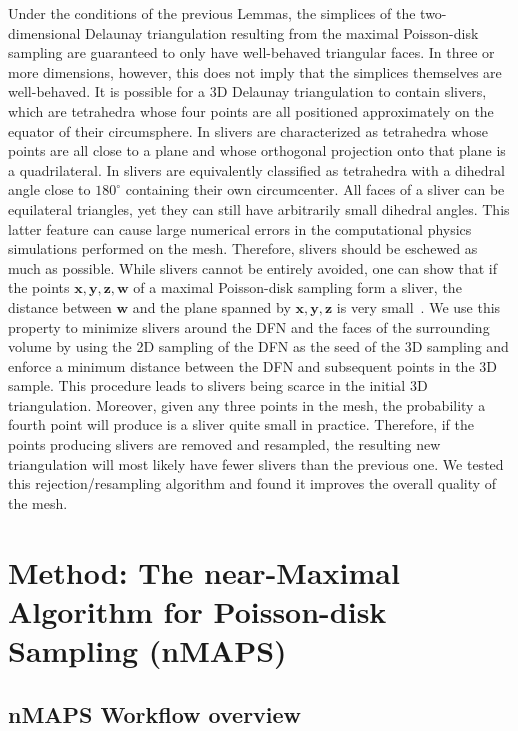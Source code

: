 \documentclass[preprint, 10pt]{elsarticle}
\newcommand{\vx}{{\mathbf x}}
\newcommand{\vy}{{\mathbf y}}
\newcommand{\vz}{{\mathbf z}}
\newcommand{\vw}{{\mathbf w}}
\theoremstyle{definition}
\theoremstyle{remark}
\begin{document}
Under the conditions of the previous Lemmas, the simplices of the two-dimensional Delaunay triangulation resulting from the maximal Poisson-disk sampling are guaranteed to only have well-behaved triangular faces. 
In three or more dimensions, however, this does not imply that the simplices themselves are well-behaved.
It is possible for a 3D Delaunay triangulation to contain slivers, which are tetrahedra whose four points are all positioned approximately on the equator of their circumsphere. 
In \cite{exudation} slivers are characterized as tetrahedra whose points are all close to a plane and whose orthogonal projection onto that plane is a quadrilateral. 
In \cite{bern} slivers are equivalently classified as tetrahedra with a dihedral angle close to $180^\circ$ containing their own circumcenter.
All faces of a sliver can be equilateral triangles, yet they can still have arbitrarily small dihedral angles.
This latter feature can cause large numerical errors in the computational physics simulations performed on the mesh.
Therefore, slivers should be eschewed as much as possible.
While slivers cannot be entirely avoided, one can show that if the points $\vx,\vy,\vz,\vw$ of a maximal Poisson-disk sampling form a sliver, the distance between $\vw$ and the plane spanned by $\vx,\vy,\vz$ is very small~\cite{exudation}.
We use this property to minimize slivers around the DFN and the faces of the surrounding volume by using the 2D sampling of the DFN as the seed of the 3D sampling and enforce a minimum distance between the DFN and subsequent points in the 3D sample.  
This procedure leads to slivers being scarce in the initial 3D triangulation.
Moreover, given any three points in the mesh, the probability a fourth point will produce is a sliver quite small in practice.   
Therefore, if the points producing slivers are removed and resampled, the resulting new triangulation will most likely have fewer slivers than the previous one. 
We tested this rejection/resampling algorithm and found it improves the overall quality of the mesh.



\section{Method: The near-Maximal Algorithm for Poisson-disk Sampling (nMAPS)}\label{sec:methods}

\subsection{nMAPS Workflow overview}
\end{document}
